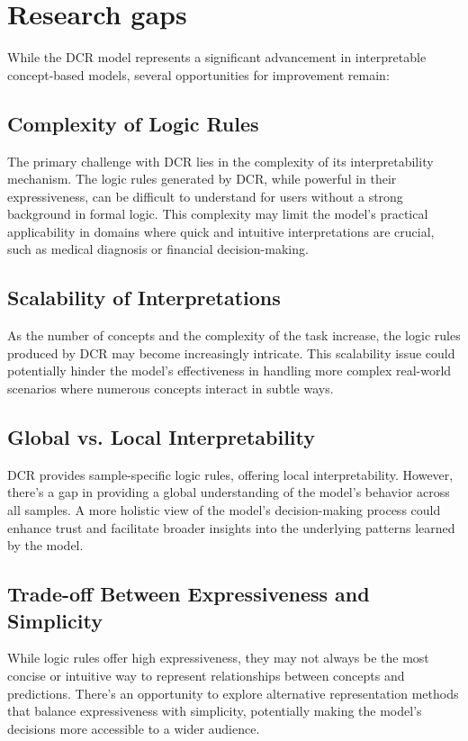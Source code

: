 \documentclass[sigconf, nonacm]{acmart}
\begin{document}
\section{Research gaps}
While the DCR model represents a significant advancement in interpretable concept-based models, several opportunities for improvement remain:

\subsection{Complexity of Logic Rules}
The primary challenge with DCR lies in the complexity of its interpretability mechanism. The logic rules generated by DCR, while powerful in their expressiveness, can be difficult to understand for users without a strong background in formal logic. This complexity may limit the model's practical applicability in domains where quick and intuitive interpretations are crucial, such as medical diagnosis or financial decision-making.
\subsection{Scalability of Interpretations}
As the number of concepts and the complexity of the task increase, the logic rules produced by DCR may become increasingly intricate. This scalability issue could potentially hinder the model's effectiveness in handling more complex real-world scenarios where numerous concepts interact in subtle ways.
\subsection{Global vs. Local Interpretability}
DCR provides sample-specific logic rules, offering local interpretability. However, there's a gap in providing a global understanding of the model's behavior across all samples. A more holistic view of the model's decision-making process could enhance trust and facilitate broader insights into the underlying patterns learned by the model.
\subsection{Trade-off Between Expressiveness and Simplicity}
While logic rules offer high expressiveness, they may not always be the most concise or intuitive way to represent relationships between concepts and predictions. There's an opportunity to explore alternative representation methods that balance expressiveness with simplicity, potentially making the model's decisions more accessible to a wider audience.
\end{document}
